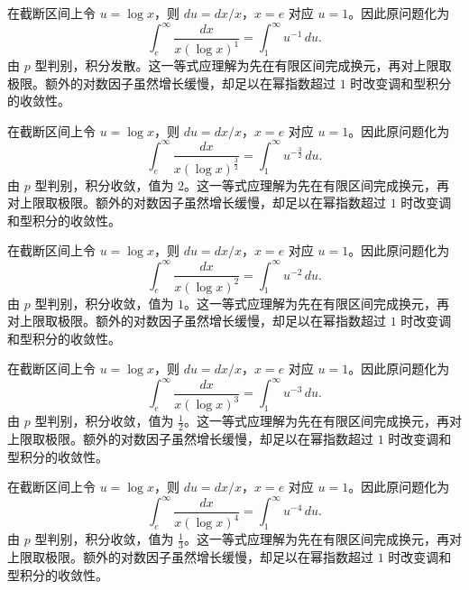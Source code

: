 \documentclass[UTF8,12pt,a4paper,fontset=fandol]{ctexart}
\begin{document}
\begin{solve}\label{ans:c19q15}
在截断区间上令 $u=\log x$，则 $du=dx/x$，$x=e$ 对应 $u=1$。因此原问题化为
\[
\int_e^\infty\frac{dx}{x(\log x)^{1}}=\int_1^\infty u^{-1}\,du.
\]
由 $p$ 型判别，积分发散。这一等式应理解为先在有限区间完成换元，再对上限取极限。额外的对数因子虽然增长缓慢，却足以在幂指数超过 $1$ 时改变调和型积分的收敛性。
\end{solve}

\begin{solve}\label{ans:c19q16}
在截断区间上令 $u=\log x$，则 $du=dx/x$，$x=e$ 对应 $u=1$。因此原问题化为
\[
\int_e^\infty\frac{dx}{x(\log x)^{\frac{3}{2}}}=\int_1^\infty u^{-\frac{3}{2}}\,du.
\]
由 $p$ 型判别，积分收敛，值为 $2$。这一等式应理解为先在有限区间完成换元，再对上限取极限。额外的对数因子虽然增长缓慢，却足以在幂指数超过 $1$ 时改变调和型积分的收敛性。
\end{solve}

\begin{solve}\label{ans:c19q17}
在截断区间上令 $u=\log x$，则 $du=dx/x$，$x=e$ 对应 $u=1$。因此原问题化为
\[
\int_e^\infty\frac{dx}{x(\log x)^{2}}=\int_1^\infty u^{-2}\,du.
\]
由 $p$ 型判别，积分收敛，值为 $1$。这一等式应理解为先在有限区间完成换元，再对上限取极限。额外的对数因子虽然增长缓慢，却足以在幂指数超过 $1$ 时改变调和型积分的收敛性。
\end{solve}

\begin{solve}\label{ans:c19q18}
在截断区间上令 $u=\log x$，则 $du=dx/x$，$x=e$ 对应 $u=1$。因此原问题化为
\[
\int_e^\infty\frac{dx}{x(\log x)^{3}}=\int_1^\infty u^{-3}\,du.
\]
由 $p$ 型判别，积分收敛，值为 $\frac{1}{2}$。这一等式应理解为先在有限区间完成换元，再对上限取极限。额外的对数因子虽然增长缓慢，却足以在幂指数超过 $1$ 时改变调和型积分的收敛性。
\end{solve}

\begin{solve}\label{ans:c19q19}
在截断区间上令 $u=\log x$，则 $du=dx/x$，$x=e$ 对应 $u=1$。因此原问题化为
\[
\int_e^\infty\frac{dx}{x(\log x)^{4}}=\int_1^\infty u^{-4}\,du.
\]
由 $p$ 型判别，积分收敛，值为 $\frac{1}{3}$。这一等式应理解为先在有限区间完成换元，再对上限取极限。额外的对数因子虽然增长缓慢，却足以在幂指数超过 $1$ 时改变调和型积分的收敛性。
\end{solve}
\end{document}
